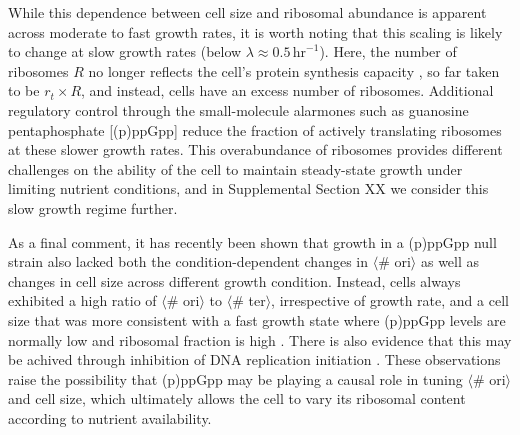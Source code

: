 
While this dependence between cell size and ribosomal abundance is apparent across
moderate to fast growth rates, it is worth noting that this scaling
is likely to change at slow growth rates (below $\lambda \approx
0.5\,\text{hr}^{-1}$). Here, the number of ribosomes $R$ no longer reflects the
cell's protein synthesis capacity \citep{dai2016}, so far taken to be $r_t
\times R$, and instead, cells have an excess number of ribosomes. Additional regulatory
control through the small-molecule alarmones such as guanosine pentaphosphate
[(p)ppGpp] reduce the fraction of actively translating ribosomes
at these slower growth rates. This overabundance of ribosomes
provides different challenges on the ability of the cell to maintain steady-state
growth under limiting nutrient conditions, and in Supplemental
Section XX we consider this slow growth regime further.


As a final comment, it has recently been shown that growth in a (p)ppGpp null
strain also lacked both the condition-dependent changes in $\langle$\#
ori$\rangle$ as well as changes in cell size across different growth condition.
Instead, cells always exhibited a high ratio of $\langle$\# ori$\rangle$ to
$\langle$\# ter$\rangle$, irrespective of growth rate, and a cell size that was
more consistent with a fast growth state where (p)ppGpp levels are normally low
\citep{fernandezcoll2020} and ribosomal fraction is high \citep{zhu2019}. There
is also evidence that this may be achived through inhibition of DNA replication
initiation \citep{kraemer2019}. These observations raise the possibility that
(p)ppGpp may be playing a causal role in tuning $\langle$\# ori$\rangle$ and
cell size, which ultimately allows the cell to vary its ribosomal content
according to nutrient availability.

